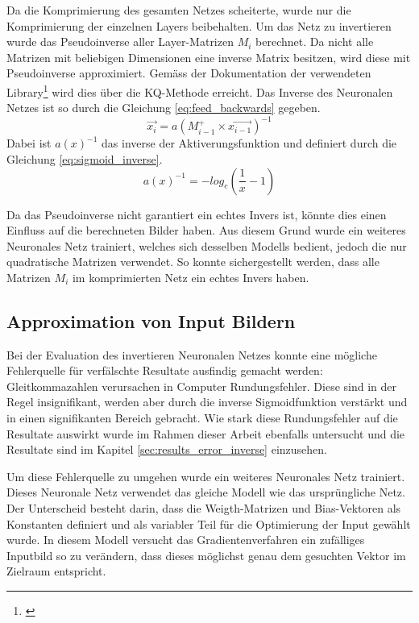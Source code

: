 \documentclass[Interploate_hadwritten_Digits.tex]{subfiles}
\begin{document}
	Da die Komprimierung des gesamten Netzes scheiterte, wurde nur die Komprimierung der einzelnen Layers beibehalten. Um das Netz zu invertieren wurde das Pseudoinverse aller Layer-Matrizen $ M_{i} $ berechnet. Da nicht alle Matrizen mit beliebigen Dimensionen eine inverse Matrix besitzen, wird diese mit Pseudoinverse approximiert. Gemäss der Dokumentation der verwendeten Library\footnote{\cite{numpy}} wird dies über die KQ-Methode erreicht. Das Inverse des Neuronalen Netzes ist so durch die Gleichung \ref{eq:feed_backwards} gegeben.
	\begin{equation}
		\vec{x_{i}} = a(M_{i-1}^{+} \times \vec{x_{i-1}})^{-1}
		\label{eq:feed_backwards}
	\end{equation}
	Dabei ist $ a(x)^{-1} $ das inverse der Aktiverungsfunktion und definiert durch die Gleichung \ref{eq:sigmoid_inverse}.
	\begin{equation}
		a(x)^{-1} = -log_{e}(\frac{1}{x} - 1)
		\label{eq:sigmoid_inverse}
	\end{equation}
	
	Da das Pseudoinverse nicht garantiert ein echtes Invers ist, könnte dies einen Einfluss auf die berechneten Bilder haben. Aus diesem Grund wurde ein weiteres Neuronales Netz trainiert, welches sich desselben Modells bedient, jedoch die nur quadratische Matrizen verwendet. So konnte sichergestellt werden, dass alle Matrizen $ M_{i} $ im komprimierten Netz ein echtes Invers haben.
	
	\subsection{Approximation von Input Bildern}
	Bei der Evaluation des invertieren Neuronalen Netzes konnte eine mögliche Fehlerquelle für verfälschte Resultate ausfindig gemacht werden: Gleitkommazahlen verursachen in Computer Rundungsfehler. Diese sind in der Regel insignifikant, werden aber durch die inverse Sigmoidfunktion verstärkt und in einen signifikanten Bereich gebracht. Wie stark diese Rundungsfehler auf die Resultate auswirkt wurde im Rahmen dieser Arbeit ebenfalls untersucht und die Resultate sind im Kapitel \ref{sec:results_error_inverse} einzusehen.
	
	Um diese Fehlerquelle zu umgehen wurde ein weiteres Neuronales Netz trainiert. Dieses Neuronale Netz verwendet das gleiche Modell wie das ursprüngliche Netz. Der Unterscheid besteht darin, dass die Weigth-Matrizen und Bias-Vektoren als Konstanten definiert und als variabler Teil für die Optimierung der Input gewählt wurde. In diesem Modell versucht das Gradientenverfahren ein zufälliges Inputbild so zu verändern, dass dieses möglichst genau dem gesuchten Vektor im Zielraum entspricht.
\end{document}

